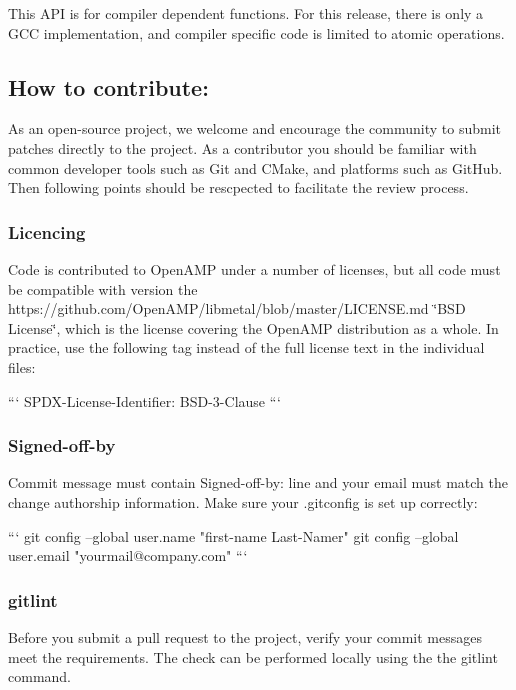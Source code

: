 This A\+PI is for compiler dependent functions. For this release, there is only a G\+CC implementation, and compiler specific code is limited to atomic operations.

\subsection*{How to contribute\+:}

As an open-\/source project, we welcome and encourage the community to submit patches directly to the project. As a contributor you should be familiar with common developer tools such as Git and C\+Make, and platforms such as Git\+Hub. Then following points should be rescpected to facilitate the review process.

\subsubsection*{Licencing}

Code is contributed to Open\+A\+MP under a number of licenses, but all code must be compatible with version the https\+://github.com/\+Open\+A\+M\+P/libmetal/blob/master/\+L\+I\+C\+E\+N\+S\+E.\+md \char`\"{}\+B\+S\+D License\char`\"{}, which is the license covering the Open\+A\+MP distribution as a whole. In practice, use the following tag instead of the full license text in the individual files\+: \begin{DoxyVerb}```
SPDX-License-Identifier:    BSD-3-Clause
```
\end{DoxyVerb}
 \subsubsection*{Signed-\/off-\/by}

Commit message must contain Signed-\/off-\/by\+: line and your email must match the change authorship information. Make sure your .gitconfig is set up correctly\+: \begin{DoxyVerb}```
git config --global user.name "first-name Last-Namer"
git config --global user.email "yourmail@company.com"
```
\end{DoxyVerb}
 \subsubsection*{gitlint}

Before you submit a pull request to the project, verify your commit messages meet the requirements. The check can be performed locally using the the gitlint command.

